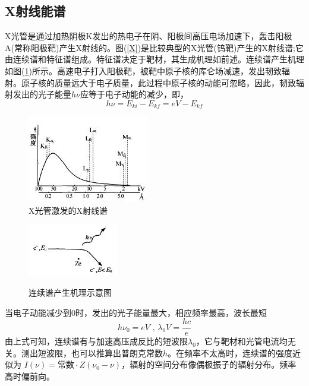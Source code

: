 \documentclass[a4paper]{article}
\begin{document}
\subsection{X射线能谱}
X光管是通过加热阴极K发出的热电子在阴、阳极间高压电场加速下，轰击阳极A(常称阳极靶)产生X射线的。图(\ref{X})是比较典型的X光管(钨靶)产生的X射线谱;它由连续谱和特征谱组成。特征谱决定于靶材，其生成机理如前述。连续谱产生机理如图(\ref{CS})所示。高速电子打入阳极靶，被靶中原子核的库仑场减速，发出韧致辐射。原子核的质量远大于电子质量，此过程中原子核的动能可忽略，因此，韧致辐射发出的光子能量$ h\nu $应等于电子动能的减少，即，
\begin{equation}
h\nu = E_{ki} - E_{kf} = eV - E_{kf}
\end{equation}
\begin{figure}[H]
\centering
\begin{minipage}[!h]{0.48\linewidth}
\begin{center}
\includegraphics{fig/X.jpg}\\
\caption{X光管激发的X射线谱}\label{X}
\end{center}
\end{minipage}
\begin{minipage}[!h]{0.48\linewidth}
\begin{center}
\includegraphics{fig/CS.jpg}\\
\end{center}
\caption{连续谱产生机理示意图}\label{CS}
\end{minipage}
\end{figure}
当电子动能减少到0时，发出的光子能量最大，相应频率最高，波长最短
\begin{equation}
h\nu_0 = eV\text{ , }\lambda_0 V = \frac{hc}{e}
\end{equation}
由上式可知，连续谱有与加速高压成反比的短波限$\lambda_0$，它与靶材和光管电流均无关。测出短波限，也可以推算出普朗克常数$ h $。在频率不太高时，连续谱的强度近似为
$I(\nu)=\text{常数}\cdot Z(\nu_0-\nu)$，辐射的空间分布像偶极振子的辐射分布。频率高时偏前向。
\end{document}
